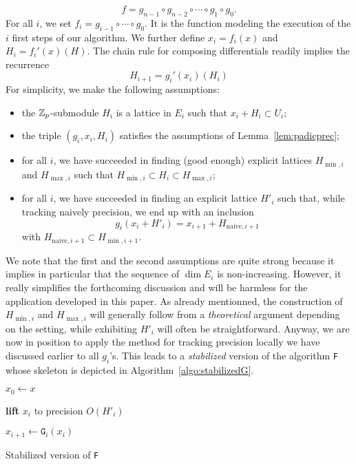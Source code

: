 \documentclass{article}
\begin{document}
$$f = g_{n-1} \circ g_{n-2} \circ \cdots \circ g_1 \circ g_0.$$
For all $i$, we set $f_i = g_{i-1} \circ \cdots \circ g_0$. It is the 
function modeling the execution of the $i$ first steps of our algorithm. 
We further define $x_i = f_i(x)$ and $H_i = f_i'(x)(H)$. The chain rule 
for composing differentials readily implies the recurrence
\begin{equation}
\label{eq:giprime}
H_{i+1} = g_i'(x_i)(H_i)
\end{equation}
For simplicity, we make the following assumptions:
\begin{itemize}
\item the $\mathbb Z_p$-submodule $H_i$ is a lattice in $E_i$ such that $x_i + 
H_i \subset U_i$;
\item the triple $(g_i, x_i, H_i)$ satisfies the assumptions of 
Lemma~\ref{lem:padicprec};
\item for all $i$, we have succeeded in finding (good enough) explicit 
lattices $H_{\min,i}$ and $H_{\max,i}$ such that $H_{\min,i} \subset H_i 
\subset H_{\max,i}$;
\item for all $i$, we have succeeded in finding an explicit lattice
$H'_i$ such that, while tracking naively precision, we end up with an
inclusion
$$g_i(x_i + H'_i) = x_{i+1} + H_{\text{naive},i+1}$$
with $H_{\text{naive},i+1} \subset H_{\min,i+1}$.
\end{itemize}
We note that the first and the second assumptions are quite strong 
because it implies in particular that the sequence of $\dim E_i$ is 
non-increasing. However, it really simplifies the forthcoming discussion 
and will be harmless for the application developed in this paper. As
already mentionned, the construction of $H_{\min,i}$ and $H_{\max,i}$
will generally follow from a \emph{theoretical} argument depending on
the setting, while exhibiting $H'_i$ will often be straightforward.
Anyway, we are now in position to apply the method for 
tracking precision locally we have discussed earlier to all $g_i$'s. 
This leads to a \emph{stabilized} version of the algorithm \texttt{F} 
whose skeleton is depicted in Algorithm~\ref{algo:stabilizedG}.
%
\begin{algorithm}
  
  \BlankLine

  $x_0 \leftarrow x$

    {\textbf{lift} $x_i$ to precision $O(H'_i)$

     $x_{i+1} \leftarrow \texttt{G}_i(x_i)$}

\caption{Stabilized version of \texttt{F}}
\label{algo:stabilizedG}
\end{algorithm}
%
\end{document}
